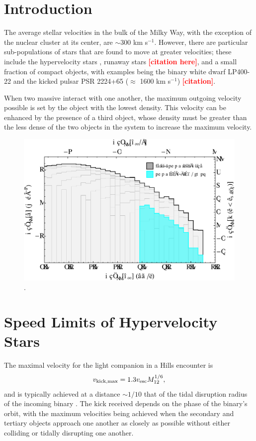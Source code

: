 \documentclass[a4paper,twocolumn]{emulateapj}
\newcommand{\colr}[1]{{\bf \textcolor{red}{[#1]}}}
\begin{document}
\section{Introduction}
The average stellar velocities in the bulk of the Milky Way, with the exception of the nuclear cluster at its center, are $\sim 300$ km s$^{-1}$. However, there are particular sub-populations of stars that are found to move at greater velocities; these include the hypervelocity stars \citep[$v \lesssim 700$ km/s][]{Brown:2011a}, runaway stars \colr{citation here}, and a small fraction of compact objects, with examples being the binary white dwarf LP400-22 \citep[$v > 830$ km s$^{-1}$]{Kilic:2013a} and the kicked pulsar PSR 2224+65 ($\approx$ 1600 km s$^{-1}$) \colr{citation}.

When two massive interact with one another, the maximum outgoing velocity possible is set by the object with the lowest density. This velocity can be enhanced by the presence of a third object, whose density must be greater than the less dense of the two objects in the system to increase the maximum velocity.

\begin{figure}
\centering\includegraphics[width=0.7\linewidth,clip=true]{histogram-2}
\caption{.}
\label{fig:histogram}
\end{figure}

\section{Speed Limits of Hypervelocity Stars}
The maximal velocity for the light companion in a Hills encounter is
\begin{equation}
v_{\rm kick,\max} = 1.3 v_{\rm esc} M_{12}^{1/6}\label{eq:vkickmax},
\end{equation}
and is typically achieved at a distance $\sim 1/10$ that of the tidal disruption radius of the incoming binary \citep{Sari:2010a}. The kick received depends on the phase of the binary's orbit, with the maximum velocities being achieved when the secondary and tertiary objects approach one another as closely as possible without either colliding or tidally disrupting one another.
\end{document}
